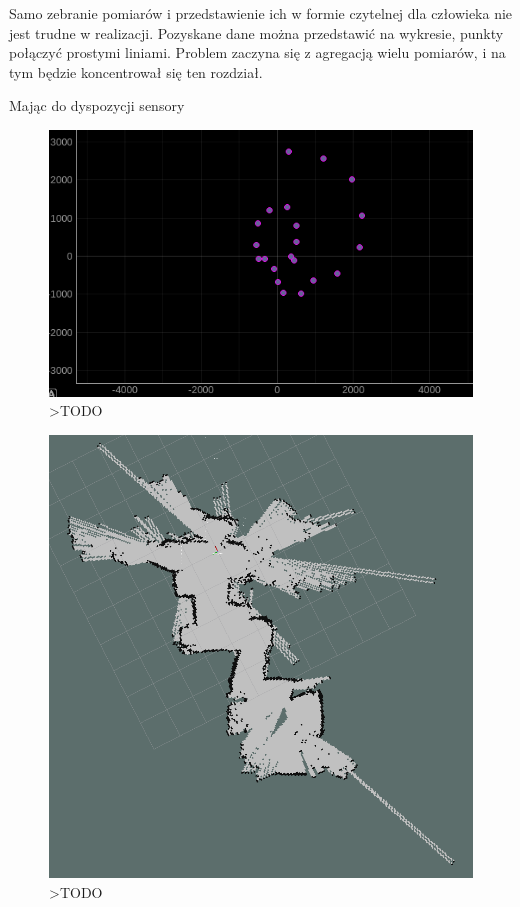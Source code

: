 Samo zebranie pomiarów i przedstawienie ich w formie czytelnej dla człowieka nie jest trudne w realizacji. Pozyskane dane można przedstawić na wykresie, punkty połączyć prostymi liniami. Problem zaczyna się z agregacją wielu pomiarów, i na tym będzie koncentrował się ten rozdział.

Mając do dyspozycji sensory


\begin{figure}[ht]
	\centering
		\includegraphics[width=0.8\linewidth]{rys/calibrated-mag-high-interference-broken-rotation.PNG}
	\caption{>TODO}
	\label{fig:xxx}
\end{figure}

\begin{figure}[ht]
	\centering
		\includegraphics[width=0.8\linewidth]{rys/2020-11-04-170347_1920x1080_scrot.PNG}
	\caption{>TODO}
	\label{fig:xxx}
\end{figure}


